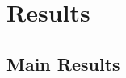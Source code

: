 \documentclass[class=../../utsthesis, crop=false]{standalone}
\begin{document}



\chapter{Results}

\blindtext
\blindtext

\blindtext
\blindtext

\section{Main Results}
\blindtext
\blindtext




\putbib
\clearpage

% 
% 
\end{document}
